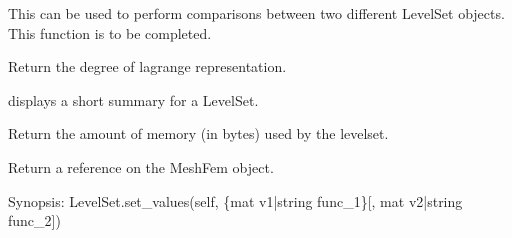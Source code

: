 \documentclass[a4paper,11pt,english]{sphinxmanual}
\begin{document}
\begin{fulllineitems}
\begin{fulllineitems}
This can be used to perform comparisons between two
different LevelSet objects.
This function is to be completed.

\end{fulllineitems}


\begin{fulllineitems}
\label{\detokenize{python/cmdref_LevelSet:getfem.LevelSet.degree}}
Return the degree of lagrange representation.

\end{fulllineitems}


\begin{fulllineitems}
\label{\detokenize{python/cmdref_LevelSet:getfem.LevelSet.display}}
displays a short summary for a LevelSet.

\end{fulllineitems}


\begin{fulllineitems}
\label{\detokenize{python/cmdref_LevelSet:getfem.LevelSet.memsize}}
Return the amount of memory (in bytes) used by the level\sphinxhyphen{}set.

\end{fulllineitems}


\begin{fulllineitems}
\label{\detokenize{python/cmdref_LevelSet:getfem.LevelSet.mf}}
Return a reference on the MeshFem object.

\end{fulllineitems}


\begin{fulllineitems}
\label{\detokenize{python/cmdref_LevelSet:getfem.LevelSet.set_values}}
Synopsis: LevelSet.set\_values(self, \{mat v1|string func\_1\}{[}, mat v2|string func\_2{]})


\end{fulllineitems}
\end{fulllineitems}
\end{document}
